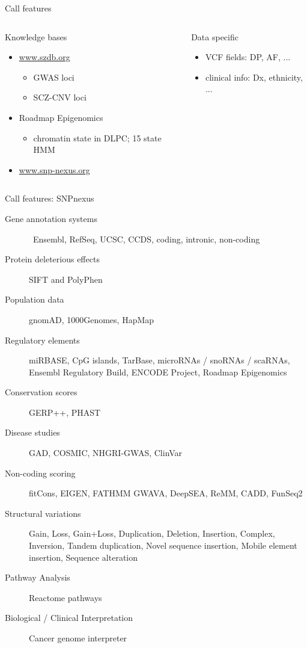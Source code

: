 \documentclass{beamer}
\begin{document}
\begin{frame}{Call features}
\begin{columns}[t]
\begin{column}{0.5\textwidth}
	Knowledge bases
\begin{itemize}
\item \url{www.szdb.org}
\begin{itemize}
\item GWAS loci
\item SCZ-CNV loci
\end{itemize}
\item Roadmap Epigenomics
\begin{itemize}
\item chromatin state in DLPC; 15 state HMM
\end{itemize}
\item \url{www.snp-nexus.org}
\end{itemize}
\end{column}

\begin{column}{0.5\textwidth}
	Data specific
\begin{itemize}
\item VCF fields: DP, AF, ...
\item clinical info: Dx, ethnicity, ...
\end{itemize}
\end{column}
\end{columns}
\end{frame}

\begin{frame}{Call features: SNPnexus}
	\tiny
	\begin{description}
		\item[Gene annotation systems]  Ensembl, RefSeq, UCSC, CCDS, coding, intronic, non-coding
                \item[Protein deleterious effects] SIFT and PolyPhen
                \item[Population data] gnomAD, 1000Genomes, HapMap
                \item[Regulatory elements] miRBASE, CpG islands, TarBase, microRNAs / snoRNAs / scaRNAs, Ensembl Regulatory Build, ENCODE Project, Roadmap Epigenomics 
                \item[Conservation scores] GERP++, PHAST 
                \item[Disease studies] GAD, COSMIC, NHGRI-GWAS, ClinVar
                \item[Non-coding scoring] fitCons, EIGEN, FATHMM GWAVA, DeepSEA, ReMM, CADD, FunSeq2 
                \item[Structural variations] Gain, Loss, Gain+Loss, Duplication, Deletion, Insertion, Complex, Inversion, Tandem duplication, Novel sequence insertion, Mobile element insertion, Sequence alteration 
                \item[Pathway Analysis] Reactome pathways 
                \item[Biological / Clinical Interpretation] Cancer genome interpreter 
	\end{description}
\end{frame}
\end{document}

